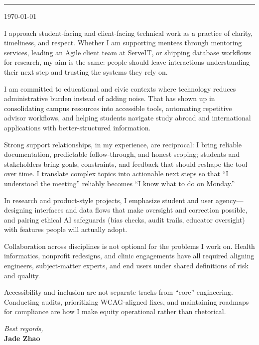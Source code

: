 \documentclass[11pt]{article}
\begin{document}


\vspace{0.5em}
\noindent\rule{\linewidth}{1pt}
\vspace{0.75em}

\noindent\today

\vspace{0.75em}

I approach student-facing and client-facing technical work as a practice of clarity, timeliness, and respect. Whether I am supporting mentees through mentoring services, leading an Agile client team at ServeIT, or shipping database workflows for research, my aim is the same: people should leave interactions understanding their next step and trusting the systems they rely on.

I am committed to educational and civic contexts where technology reduces administrative burden instead of adding noise. That has shown up in consolidating campus resources into accessible tools, automating repetitive advisor workflows, and helping students navigate study abroad and international applications with better-structured information.

Strong support relationships, in my experience, are reciprocal: I bring reliable documentation, predictable follow-through, and honest scoping; students and stakeholders bring goals, constraints, and feedback that should reshape the tool over time. I translate complex topics into actionable next steps so that ``I understood the meeting'' reliably becomes ``I know what to do on Monday.''

In research and product-style projects, I emphasize student and user agency---designing interfaces and data flows that make oversight and correction possible, and pairing ethical AI safeguards (bias checks, audit trails, educator oversight) with features people will actually adopt.

Collaboration across disciplines is not optional for the problems I work on. Health informatics, nonprofit redesigns, and clinic engagements have all required aligning engineers, subject-matter experts, and end users under shared definitions of risk and quality.

Accessibility and inclusion are not separate tracks from ``core'' engineering. Conducting audits, prioritizing WCAG-aligned fixes, and maintaining roadmaps for compliance are how I make equity operational rather than rhetorical.

\vspace{1.5em}
\noindent\textit{Best regards,}\\
\textbf{Jade Zhao}

\end{document}
